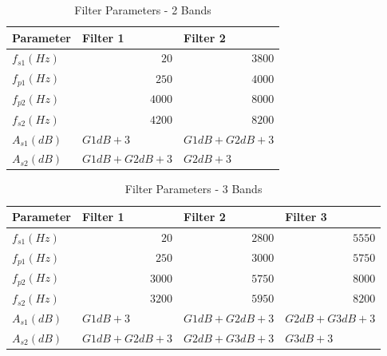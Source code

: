 \documentclass[11pt,onecolumn]{witseiepaper}
\begin{document}
\begin{appendices}
\begin{table}[htbp]
  \centering
  \caption{Filter Parameters - 2 Bands}
    \begin{tabular}{|l|l|l|}
    \hline
    \textbf{Parameter} & \textbf{Filter 1} & \textbf{Filter 2} \\
    \hline
    $f_{s1} (Hz)$   & \multicolumn{1}{r|}{$20$} & \multicolumn{1}{r|}{$ 3800$ } \\
    \hline
    $f_{p1} (Hz)$  & \multicolumn{1}{r|}{$250$} & \multicolumn{1}{r|}{$4000$} \\
    \hline
    $f_{p2} (Hz)$   & \multicolumn{1}{r|}{$ 4000$ } & \multicolumn{1}{r|}{$8000$} \\
    \hline
    $f_{s2} (Hz)$   & \multicolumn{1}{r|}{$ 4200$ } & \multicolumn{1}{r|}{$8200$} \\
    \hline
    $A_{s1} (dB)$   & $G1dB + 3$ & $G1dB + G2dB + 3$ \\
    \hline
    $A_{s2} (dB)$   & $G1dB + G2dB + 3$ & $G2dB + 3$ \\
    \hline
    \end{tabular}%
  \label{tab:filtPara2Band}%
\end{table}%

\begin{table}[htbp]
  \centering
  \caption{Filter Parameters - 3 Bands}
    \begin{tabular}{|l|l|l|l|}
    \hline
    \textbf{Parameter} & \textbf{Filter 1} & \textbf{Filter 2} & \textbf{Filter 3} \\
    \hline
    $f_{s1} (Hz)$   & \multicolumn{1}{r|}{$ 20$ } & \multicolumn{1}{r|}{$ 2800$ } & \multicolumn{1}{r|}{$ 5550$ } \\
    \hline
    $f_{p1} (Hz)$   & \multicolumn{1}{r|}{$ 250$ } & \multicolumn{1}{r|}{$ 3000$ } & \multicolumn{1}{r|}{$ 5750$ } \\
    \hline
    $f_{p2} (Hz)$   & \multicolumn{1}{r|}{$ 3000$ } & \multicolumn{1}{r|}{$ 5750$ } & \multicolumn{1}{r|}{$ 8000$ } \\
    \hline
    $f_{s2} (Hz)$   & \multicolumn{1}{r|}{$ 3200$ } & \multicolumn{1}{r|}{$ 5950$ } & \multicolumn{1}{r|}{$ 8200$ } \\
    \hline
    $A_{s1} (dB)$   &$  G1dB + 3$  & $ G1dB + G2dB + 3$  & $ G2dB + G3dB + 3$  \\
    \hline
    $A_{s2} (dB)$   & $ G1dB + G2dB + 3$  & $ G2dB + G3dB + 3 $ & $ G3dB + 3$  \\
    \hline
    \end{tabular}%
  \label{tab:filtPara3Band}%
\end{table}%



\end{appendices}
\end{document}
